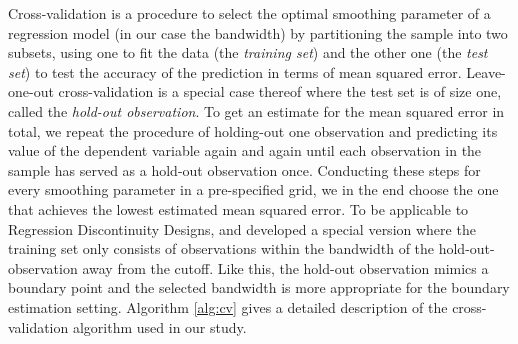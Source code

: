 Cross-validation is a procedure to select the optimal smoothing parameter of a regression model (in our case the bandwidth) by partitioning the sample into two subsets, using one to fit the data (the \textit{training set}) and the other one (the \textit{test set}) to test the accuracy of the prediction in terms of mean squared error. Leave-one-out cross-validation is a special case thereof where the test set is of size one, called the \textit{hold-out observation}. To get an estimate for the mean squared error in total, we repeat the procedure of holding-out one observation and predicting its value of the dependent variable again and again until each observation in the sample has served as a hold-out observation once. Conducting these steps for every smoothing parameter in a pre-specified grid, we in the end choose the one that achieves the lowest estimated mean squared error. To be applicable to Regression Discontinuity Designs, \cite{imb_lemieux} and \cite{ludwig_miller} developed a special version where the training set only consists of observations within the bandwidth of the hold-out-observation away from the cutoff. Like this, the hold-out observation mimics a boundary point and the selected bandwidth is more appropriate for the boundary estimation setting. Algorithm \ref{alg:cv} gives a detailed description of the cross-validation algorithm used in our study.

